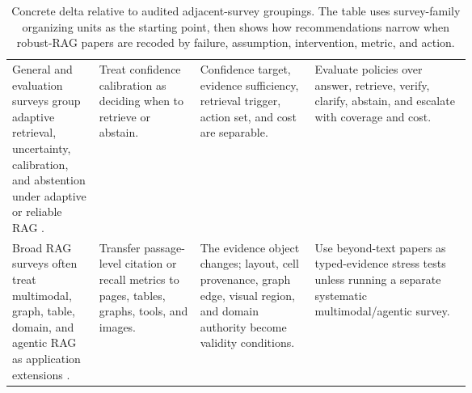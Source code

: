 \documentclass[11pt]{article}
\begin{document}
\begin{table}[t]
\begin{tabularx}{\linewidth}{>{\raggedright\arraybackslash}p{0.19\linewidth}>{\raggedright\arraybackslash}p{0.22\linewidth}>{\raggedright\arraybackslash}p{0.25\linewidth}X}
General and evaluation surveys group adaptive retrieval, uncertainty, calibration, and abstention under adaptive or reliable RAG \citep{ragComprehensive2025,ragEvaluationSurvey2024}. & Treat confidence calibration as deciding when to retrieve or abstain. & Confidence target, evidence sufficiency, retrieval trigger, action set, and cost are separable. & Evaluate policies over answer, retrieve, verify, clarify, abstain, and escalate with coverage and cost. \\
Broad RAG surveys often treat multimodal, graph, table, domain, and agentic RAG as application extensions \citep{ragSurvey2024,ragComprehensive2025}. & Transfer passage-level citation or recall metrics to pages, tables, graphs, tools, and images. & The evidence object changes; layout, cell provenance, graph edge, visual region, and domain authority become validity conditions. & Use beyond-text papers as typed-evidence stress tests unless running a separate systematic multimodal/agentic survey. \\
\bottomrule
\end{tabularx}
\caption{Concrete delta relative to audited adjacent-survey groupings. The table uses survey-family organizing units as the starting point, then shows how recommendations narrow when robust-RAG papers are recoded by failure, assumption, intervention, metric, and action.}
\label{tab:main-prior-survey-error-cases}
\end{table}

\end{document}
